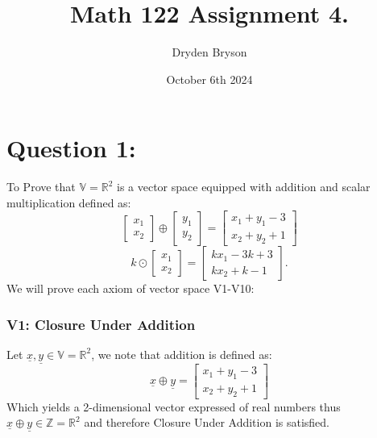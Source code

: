 \documentclass{article}
\title{Math 122 Assignment 4.}
\author{Dryden Bryson}
\date{October 6th 2024}
\begin{document}
\maketitle
\newpage
\section*{Question 1:}
To Prove that $\mathbb{V}=\mathbb{R}^{2}$ is a vector space equipped with addition and scalar multiplication defined as:
$$
\begin{bmatrix} x_1 \\ x_2 \end{bmatrix} \oplus \begin{bmatrix} y_1 \\ y_2 \end{bmatrix} = \begin{bmatrix} x_1 + y_1 - 3 \\ x_2 + y_2 + 1 \end{bmatrix}
$$ 
$$k \odot \begin{bmatrix} x_1 \\ x_2 \end{bmatrix} = \begin{bmatrix} kx_1 - 3k + 3 \\ kx_2 + k - 1 \end{bmatrix}.
$$
We will prove each axiom of vector space V1-V10:
\subsubsection*{V1: Closure Under Addition}
Let $\underline{x},\underline{y}\in \mathbb{V}=\mathbb{R}^{2}$, we note that addition is defined as:
$$
\underline{x}\oplus\underline{y} = \begin{bmatrix} x_1 + y_1 - 3 \\ x_2 + y_2 + 1 \end{bmatrix}
$$ 
Which yields a 2-dimensional vector expressed of real numbers thus $\underline{x}\oplus\underline{y}\in\mathbb{Z}=\mathbb{R}^{2}$
and therefore Closure Under Addition is satisfied.
\end{document}
